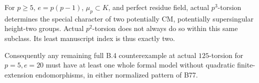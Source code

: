 \begin{theorem}
\label{thm:B-RD78}
For \(p\ge5\), \(e=p(p-1)\), \(\mu_p\subset K\), and
perfect residue field, actual \(p^3\)-torsion determines the
special character of two potentially CM, potentially supersingular
height-two groups. Actual \(p^2\)-torsion does not always do so
within this same subclass. Its least manuscript index is thus
exactly two.

Consequently any remaining full B.4 counterexample at actual
\(125\)-torsion for \(p=5,e=20\) must have at least one
whole formal model without quadratic finite-extension
endomorphisms, in either normalized pattern of B77.
\end{theorem}
